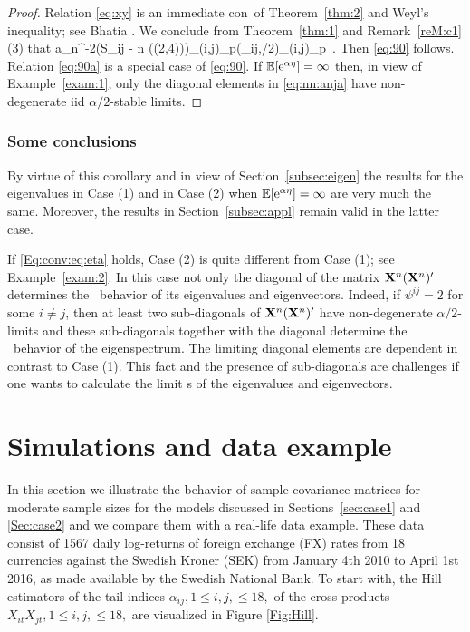 \begin{proof} Relation \eqref{eq:xy} is an immediate con\seq\ of Theorem~\ref{thm:2} and Weyl's inequality; 
see Bhatia \cite{bhatia:1997}. We conclude  from Theorem~\ref{thm:1} and Remark~\ref{reM:c1}(3) that
\beam\label{eq:nn:anja}
a_n^{-2}\big(S_{ij}  - n\,\E[X^2]\,\I (\alpha\in (2,4))\big)_{(i,j)\in \Gamma_p}\std \big(\xi_{ij,\alpha/2}\big)_{(i,j)\in \Gamma_p} \,.
\eeam
Then \eqref{eq:90} follows. Relation \eqref{eq:90a} is a special case of \eqref{eq:90}. If ${\mathbb E} [{\rm e}^{\alpha\eta}]=\infty$ then, 
in view of Example~\ref{exam:1}, only the diagonal elements in \eqref{eq:nn:anja} have non-degenerate iid $\alpha/2$-stable limits.
\end{proof}
\subsubsection*{Some conclusions}
By virtue of this corollary and in view of Section~\ref{subsec:eigen} the results for the eigenvalues 
in Case (1) and in Case (2) when ${\mathbb E} [{\rm e}^{\alpha\eta}]=\infty$ are very much the same. Moreover, the results in 
Section~\ref{subsec:appl} remain valid in the latter case.
\par
If \eqref{Eq:conv:eq:eta} holds, Case (2) is quite different from Case (1); see Example~\ref{exam:2}.
In this case not only the diagonal of the matrix ${\bf X}^n({\bf X}^n)'$ determines the
\asy\ behavior of its eigenvalues and eigenvectors. Indeed, if $\psi^{ij}=2$ for some $i\ne j$, then
at least two sub-diagonals of ${\bf X}^n({\bf X}^n)'$ have non-degenerate $\alpha/2$-limits and these sub-diagonals together
with the diagonal determine the \asy\ behavior of the eigenspectrum. The limiting diagonal elements are dependent
in contrast to Case (1). This fact and the presence of sub-diagonals are challenges if one wants to calculate
the limit \ds s of the eigenvalues and eigenvectors.
\section{Simulations and data example}\label{sec:simulation}\setcounter{equation}{0}
In this section we illustrate the behavior of sample covariance matrices for moderate sample sizes
for the models discussed in Sections~\ref{sec:case1} and \ref{Sec:case2} 
and we compare them with a real-life data example. These data consist of
1567 daily log-returns of foreign exchange (FX) rates from
18 currencies against the Swedish Kroner (SEK) from January 4th 2010 to April 1st 2016, as made available by the Swedish National Bank. To start with, the Hill estimators of the tail indices $\alpha_{ij}, 1 \leq i,j, \leq 18,$ of the cross 
products $X_{it}X_{jt}, 1 \leq i,j, \leq 18,$ are visualized in Figure
\ref{Fig:Hill}.

